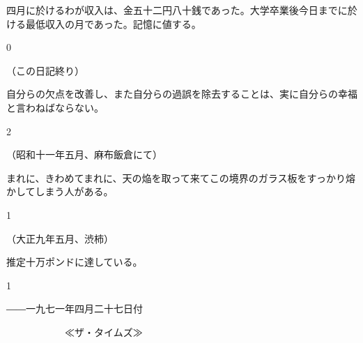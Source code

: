 \documentclass[a4paper,tate]{jlreq}
\begin{document}
四月に於けるわが収入は、金五十二円八十銭であった。大学卒業後今日までに於ける最低収入の月であった。記憶に値する。

\begin{azconvAlignBottom}{0\zw}

\hfill （この日記終り）

\end{azconvAlignBottom}

自分らの欠点を改善し、また自分らの過誤を除去することは、実に自分らの幸福と言わねばならない。

\begin{azconvAlignBottom}{2\zw}

\hfill （昭和十一年五月、麻布飯倉にて）

\end{azconvAlignBottom}

まれに、きわめてまれに、天の焔を取って来てこの境界のガラス板をすっかり熔かしてしまう人がある。

\begin{azconvAlignBottom}{1\zw}

\hfill （大正九年五月、渋柿）

\end{azconvAlignBottom}



推定十万ポンドに達している。

\begin{azconvAlignBottom}{1\zw}

\hfill ――一九七一年四月二十七日付

\hfill 　　　　　　≪ザ・タイムズ≫

\end{azconvAlignBottom}



\newpage
\end{document}
